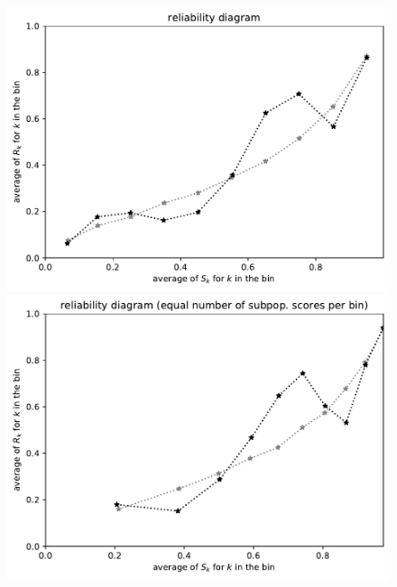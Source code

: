 \documentclass{article}
\begin{document}
\begin{figure}
\begin{centering}
\parbox{\imsize}{\includegraphics[width=\imsize]
                 {./codes/unweighted/50000_2500_10_1/equiscore.pdf}}
\quad\quad
\parbox{\imsize}{\includegraphics[width=\imsize]
                 {./codes/unweighted/50000_2500_10_1/equisamps.pdf}}

\vspace{\vertsep}


\end{centering}
\end{figure}
\end{document}

